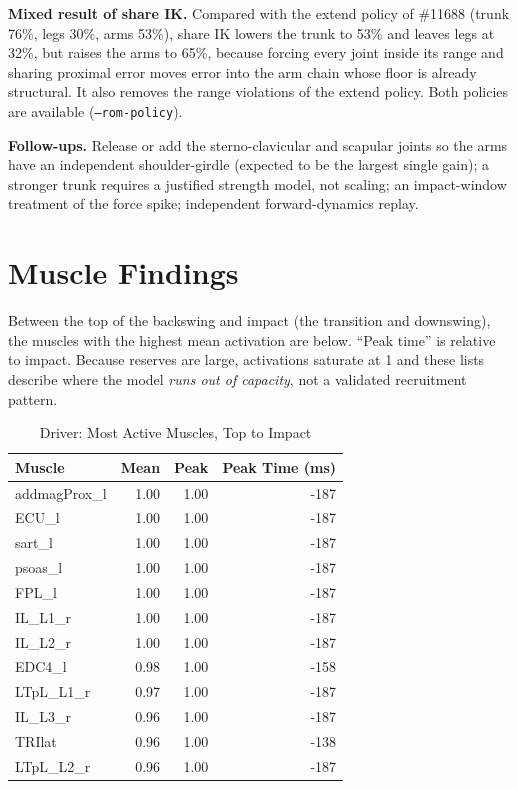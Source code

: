 \documentclass[11pt,a4paper]{article}
\begin{document}
\textbf{Mixed result of share IK.} Compared with the extend policy of \#11688 (trunk 76\%, legs 30\%, arms 53\%), share IK lowers the trunk to 53\% and leaves legs at 32\%, but raises the arms to 65\%, because forcing every joint inside its range and sharing proximal error moves error into the arm chain whose floor is already structural. It also removes the range violations of the extend policy. Both policies are available (\texttt{--rom-policy}).

\textbf{Follow-ups.} Release or add the sterno-clavicular and scapular joints so the arms have an independent shoulder-girdle (expected to be the largest single gain); a stronger trunk requires a justified strength model, not scaling; an impact-window treatment of the force spike; independent forward-dynamics replay.

\section{Muscle Findings}
Between the top of the backswing and impact (the transition and downswing), the muscles with the highest mean activation are below. ``Peak time'' is relative to impact. Because reserves are large, activations saturate at 1 and these lists describe where the model \emph{runs out of capacity}, not a validated recruitment pattern.

\begin{table}[h]\centering\small
\caption{Driver: Most Active Muscles, Top to Impact}
\begin{tabular}{lrrr}\toprule Muscle & Mean & Peak & Peak Time (ms) \\\midrule
addmagProx\_l & 1.00 & 1.00 & -187 \\
ECU\_l & 1.00 & 1.00 & -187 \\
sart\_l & 1.00 & 1.00 & -187 \\
psoas\_l & 1.00 & 1.00 & -187 \\
FPL\_l & 1.00 & 1.00 & -187 \\
IL\_L1\_r & 1.00 & 1.00 & -187 \\
IL\_L2\_r & 1.00 & 1.00 & -187 \\
EDC4\_l & 0.98 & 1.00 & -158 \\
LTpL\_L1\_r & 0.97 & 1.00 & -187 \\
IL\_L3\_r & 0.96 & 1.00 & -187 \\
TRIlat & 0.96 & 1.00 & -138 \\
LTpL\_L2\_r & 0.96 & 1.00 & -187 \\
\bottomrule\end{tabular}\end{table}
\end{document}
